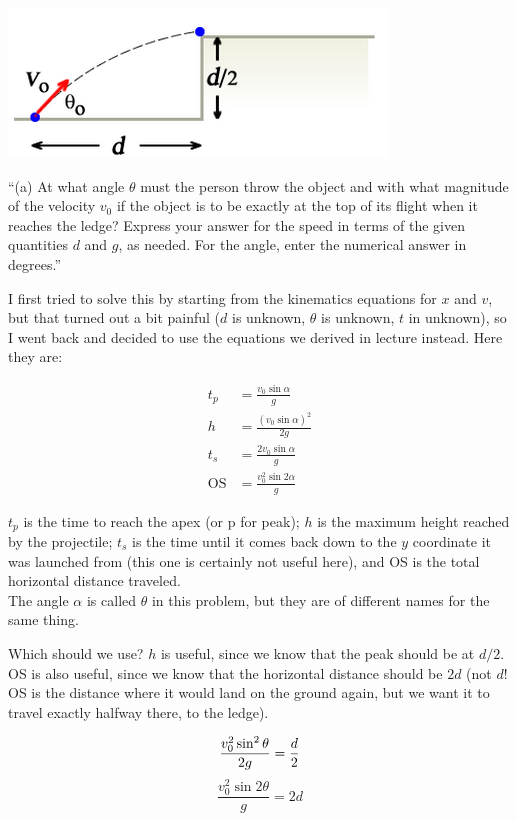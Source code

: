 \documentclass[8.01x]{subfiles}
\begin{document}
\begin{center}
\includegraphics[scale=0.6]{Graphics/h2p3_1}
\end{center}

``(a) At what angle $\theta$ must the person throw the object and with what magnitude of the velocity $v_0$ if the object is to be exactly at the top of its flight when it reaches the ledge? Express your answer for the speed in terms of the given quantities $d$ and $g$, as needed. For the angle, enter the numerical answer in degrees.''

I first tried to solve this by starting from the kinematics equations for $x$ and $v$, but that turned out a bit painful ($d$ is unknown, $\theta$ is unknown, $t$ in unknown), so I went back and decided to use the equations we derived in lecture instead. Here they are:

\begin{align}
t_p &= \frac{v_0 \sin \alpha}{g}\\
h &= \frac{(v_0 \sin \alpha)^2}{2g}\\
t_s &= \frac{2 v_0 \sin \alpha}{g}\\
\text{OS} &= \frac{v_0^2 \sin 2\alpha}{g}
\end{align}

$t_p$ is the time to reach the apex (or p for peak); $h$ is the maximum height reached by the projectile; $t_s$ is the time until it comes back down to the $y$ coordinate it was launched from (this one is certainly not useful here), and OS is the total horizontal distance traveled.\\
The angle $\alpha$ is called $\theta$ in this problem, but they are of different names for the same thing.

Which should we use? $h$ is useful, since we know that the peak should be at $d/2$. OS is also useful, since we know that the horizontal distance should be $2d$ (not $d$! OS is the distance where it would land on the ground again, but we want it to travel exactly halfway there, to the ledge).

\begin{equation}
\frac{v_0^2 \sin^2 \theta}{2g} = \frac{d}{2}\\
\end{equation}
\begin{equation}
\frac{v_0^2 \sin 2\theta}{g} = 2d
\end{equation}
\end{document}
